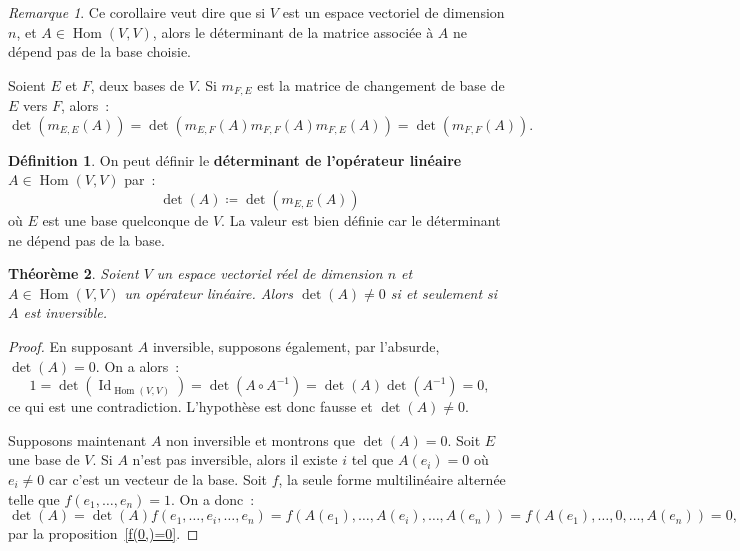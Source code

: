 \documentclass{article}
\DeclareMathOperator{\Id}{Id}
\DeclareMathOperator{\Hom}{Hom}
\newtheorem{thm}{Théorème}[section]
\theoremstyle{definition}
\newtheorem{déf}[thm]{Définition}
\theoremstyle{remark}
\newtheorem*{rmq}{Remarque}
\begin{document}
		\begin{rmq} Ce corollaire veut dire que si $V$ est un espace vectoriel de dimension $n$, et $A \in \Hom(V, V)$, alors le déterminant de la matrice associée à
		$A$ ne dépend pas de la base choisie.

		Soient $E$ et $F$, deux bases de $V$. Si $m_{F, E}$ est la matrice de changement de base de $E$ vers $F$, alors~:
		\[\det(m_{E, E}(A)) = \det(m_{E, F}(A)m_{F, F}(A)m_{F, E}(A)) = \det(m_{F, F}(A)).\] \end{rmq}

		\begin{déf} On peut définir le \textbf{déterminant de l'opérateur linéaire} $A \in \Hom(V, V)$ par~: \[\det(A) \coloneqq \det(m_{E, E}(A))\] où $E$ est
		une base quelconque de $V$. La valeur est bien définie car le déterminant ne dépend pas de la base. \end{déf}

		\begin{thm}\label{inversiblessidet=0} Soient $V$ un espace vectoriel réel de dimension $n$ et $A \in \Hom(V, V)$ un opérateur linéaire. Alors $\det(A) \neq 0$
		si et seulement si $A$ est inversible. \end{thm}

		\begin{proof} En supposant $A$ inversible, supposons également, par l'absurde, $\det(A) = 0$. On a alors~:
		\[1 = \det(\Id_{\Hom(V, V)}) = \det(A \circ A^{-1}) = \det(A)\det(A^{-1}) = 0,\] ce qui est une contradiction. L'hypothèse est donc fausse et $\det(A) \neq 0$.

		Supposons maintenant $A$ non inversible et montrons que $\det(A) = 0$. Soit $E$ une base de $V$. Si $A$ n'est pas inversible, alors il existe $i$ tel que
		$A(e_i) = 0$ où $e_i \neq 0$ car c'est un vecteur de la base. Soit $f$, la seule forme multilinéaire alternée telle que $f(e_1, \dotsc, e_n) = 1$. On a donc~:
		\[\det(A) = \det(A)f(e_1, \dotsc, e_i, \dotsc, e_n) = f(A(e_1), \dotsc, A(e_i), \dotsc, A(e_n)) = f(A(e_1), \dotsc, 0, \dotsc, A(e_n)) = 0,\]
		par la proposition~\ref{f(0,)=0}. \end{proof}
\end{document}
